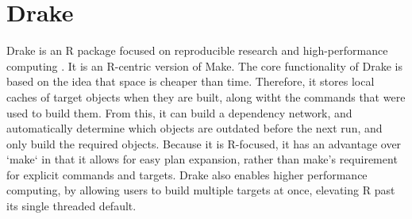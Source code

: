 \section{Drake}

Drake is an R package focused on reproducible research and high-performance
computing \Cite{hid-sp18-403-R-drake}. It is an R-centric version of Make. The
core functionality of Drake is based on the idea that space is cheaper than
time.  Therefore, it stores local caches of target objects when they are built,
along witht the commands that were used to build them. From this, it can build
a dependency network, and automatically determine which objects are outdated
before the next run, and only build the required objects. Because it is
R-focused, it has an advantage over `make` in that it allows for easy plan
expansion, rather than make’s requirement for explicit commands and targets.
Drake also enables higher performance computing, by allowing users to build
multiple targets at once, elevating R past its single threaded default.
